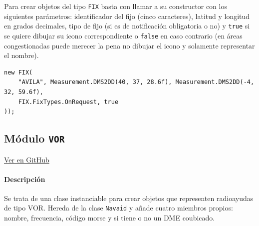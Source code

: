 Para crear objetos del tipo \texttt{FIX} basta con llamar a su constructor con los siguientes parámetros: identificador del fijo (cinco caracteres), latitud y longitud en grados decimales, tipo de fijo (si es de notificación obligatoria o no) y \texttt{true} si se quiere dibujar su icono correspondiente o \texttt{false} en caso contrario (en áreas congestionadas puede merecer la pena no dibujar el icono y solamente representar el nombre).

\begin{table}[!hbtp]
	\caption{Ejemplo de instancia al constructor de la clase \texttt{FIX}.}
	\label{tab:EjemploFIX}
\end{table}
\vspace{-0.8cm}
\begin{scriptsize}
\begin{Verbatim}[frame=single]
new FIX(
    "AVILA", Measurement.DMS2DD(40, 37, 28.6f), Measurement.DMS2DD(-4, 32, 59.6f),
    FIX.FixTypes.OnRequest, true
));
\end{Verbatim}
\end{scriptsize}







\subsection{Módulo \texttt{VOR}}
\label{subsec:ClaseVOR}

\vspace{-0.85cm}
\begin{flushright}
\href{https://github.com/macgyver912/atc-simulator/blob/jaime/Assets/Scripts/navaids/VOR.cs}{Ver en GitHub \faGithub}
\end{flushright}

\paragraph{Descripción} \phantom{\newline}

Se trata de una clase instanciable para crear objetos que representen radioayudas de tipo VOR. Hereda de la clase \texttt{Navaid} y añade cuatro miembros propios: nombre, frecuencia, código morse y si tiene o no un DME coubicado.

